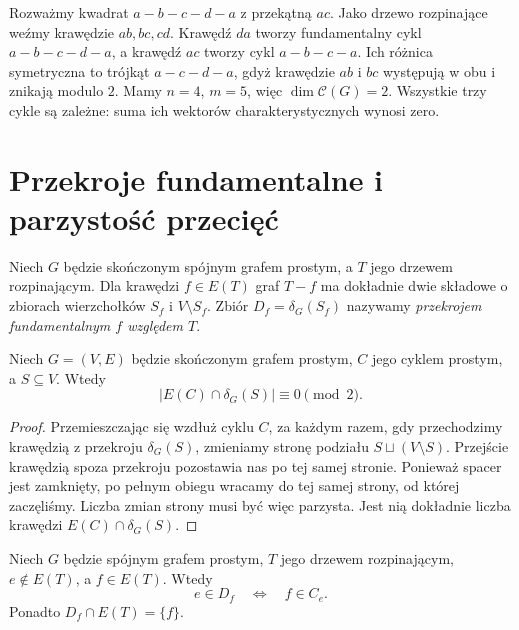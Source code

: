 \begin{przyklad}
Rozważmy kwadrat $a-b-c-d-a$ z przekątną $ac$.
Jako drzewo rozpinające weźmy krawędzie
$ab,bc,cd$. Krawędź $da$ tworzy fundamentalny
cykl $a-b-c-d-a$, a krawędź $ac$ tworzy
cykl $a-b-c-a$. Ich różnica symetryczna to
trójkąt $a-c-d-a$, gdyż krawędzie $ab$ i $bc$
występują w obu i znikają modulo $2$.
Mamy $n=4$, $m=5$, więc $\dim\mathcal C(G)=2$.
Wszystkie trzy cykle są zależne: suma ich
wektorów charakterystycznych wynosi zero.
\end{przyklad}

\section{Przekroje fundamentalne i parzystość przecięć}
\label{sec:tg-przekroje-fundamentalne}

\begin{definicja}
Niech $G$ będzie skończonym spójnym grafem
prostym, a $T$ jego drzewem rozpinającym.
Dla krawędzi $f\in E(T)$ graf $T-f$
ma dokładnie dwie składowe o zbiorach
wierzchołków $S_f$ i $V\setminus S_f$.
Zbiór $D_f=\delta_G(S_f)$ nazywamy
\emph{przekrojem fundamentalnym $f$
względem $T$}.
\end{definicja}

\begin{stwierdzenie}
Niech $G=(V,E)$ będzie skończonym grafem prostym,
$C$ jego cyklem prostym, a $S\subseteq V$.
Wtedy
\[
|E(C)\cap\delta_G(S)|\equiv0\pmod2.
\]
\end{stwierdzenie}

\begin{proof}
Przemieszczając się wzdłuż cyklu $C$, za
każdym razem, gdy przechodzimy krawędzią
z przekroju $\delta_G(S)$, zmieniamy
stronę podziału $S\sqcup(V\setminus S)$.
Przejście krawędzią spoza przekroju pozostawia
nas po tej samej stronie. Ponieważ spacer
jest zamknięty, po pełnym obiegu wracamy
do tej samej strony, od której zaczęliśmy.
Liczba zmian strony musi być więc parzysta.
Jest nią dokładnie liczba krawędzi
$E(C)\cap\delta_G(S)$.
\end{proof}

\begin{stwierdzenie}
Niech $G$ będzie spójnym grafem prostym,
$T$ jego drzewem rozpinającym, $e\notin E(T)$,
a $f\in E(T)$. Wtedy
\[
e\in D_f\quad\Longleftrightarrow\quad f\in C_e.
\]
Ponadto $D_f\cap E(T)=\{f\}$.
\end{stwierdzenie}

